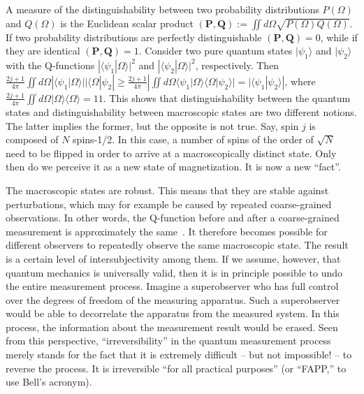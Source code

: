 \documentclass[12pt,a4]{article}
\newcommand{\unit}{1\!\!1}
\begin{document}
A measure of the distinguishability between two probability distributions $P(\Omega)$ and $Q(\Omega)$ is the Euclidean scalar product $({\mathbf P},{\mathbf Q}) := \iint d\Omega \sqrt{ P(\Omega) Q(\Omega)}$. If two probability distributions are perfectly distinguishable $({\mathbf P},{\mathbf Q})= 0$, while if they are identical $({\mathbf P},{\mathbf Q})=1$. Consider two pure quantum states $|\psi_1\rangle$ and $|\psi_2\rangle$ with the Q-functions $|\langle \psi_1 |\Omega\rangle |^2$ and $|\langle \psi_2 |\Omega\rangle |^2$, respectively. Then $ \frac{2j+1}{4\pi} \iint d\Omega \left| \langle \psi_1|\Omega\rangle| |\langle \Omega \right|\psi_2| \geq \frac{2j+1}{4\pi} |\iint d\Omega \langle \psi_1 |\Omega\rangle \langle \Omega|\psi_2 \rangle| =|\langle \psi_1|\psi_2 \rangle|$, where $\frac{2j+1}{4\pi}\iint d\Omega |\Omega\rangle \langle\Omega \rangle =\unit$. This shows that distinguishability between the quantum states and distinguishability between macroscopic states are two different notions. The latter implies the former, but the opposite is not true. Say, spin $j$ is composed of $N$ spins-1/2. In this case, a number of spins of the order of $\sqrt{N}$ need to be flipped in order to arrive at a macroscopically distinct state. Only then do we perceive it as a new state of magnetization. It is now a new ``fact''.

The macroscopic states are robust. This means that they are stable against perturbations, which may for example be caused by repeated coarse-grained observations. In other words, the Q-function before and after a coarse-grained measurement is approximately the same~\cite{kofler2}. It therefore becomes possible for different observers to repeatedly observe the same macroscopic state. The result is a certain level of intersubjectivity among them. If we assume, however, that quantum mechanics is universally valid, then it is in principle possible to undo the entire measurement process. Imagine a superobserver who has full control over the degrees of freedom of the measuring apparatus. Such a superobserver would be able to decorrelate the apparatus from the measured system. In this process, the information about the measurement result would be erased. Seen from this perspective, ``irreversibility'' in the quantum measurement process merely stands for the fact that it is extremely difficult -- but not impossible! -- to reverse the process. It is irreversible ``for all practical purposes'' (or ``FAPP,'' to use Bell's acronym). 
\end{document}

